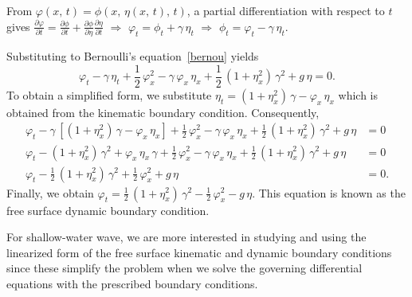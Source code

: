 \documentclass[12pt,a4paper]{report}
\begin{document}
From $\varphi(x,\,t) = \phi(x, \, \eta(x,\,t), \,t)$, a partial differentiation with respect to $t$ gives $\displaystyle \frac{\partial \varphi}{\partial t} =
\frac{\partial\phi}{\partial t} + \frac{\partial\phi}{\partial\eta} \frac{\partial\eta}{\partial t}$ \quad $\Longrightarrow$ \quad $\varphi_{t} = \phi_{t} +
\gamma \,\eta_{t}$ \quad $\Longrightarrow$ \quad $\phi_{t} = \varphi_{t} - \gamma\,\eta_{t}$.

Substituting to Bernoulli's equation~\eqref{bernou} yields
\begin{equation}
\varphi_{t} - \gamma\,\eta_{t} + \frac{1}{2}\,\varphi_{x}^2 - \gamma \,\varphi_{x} \, \eta_{x} + \frac{1}{2}\,\left(1 + \eta_{x}^2 \right) \,\gamma^2 + g\,\eta = 0.
\end{equation}
To obtain a simplified form, we substitute $\eta_{t} = \left(1 + \eta_{x}^2 \right) \,\gamma - \varphi_{x}\,\eta_{x}$ which is obtained from the kinematic boundary condition. Consequently,
\begin{align}
\varphi_{t} - \gamma\, \left[\left(1 + \eta_{x}^2 \right) \,\gamma - \varphi_{x}\,\eta_{x} \right] + \frac{1}{2}\,\varphi_{x}^2 - \gamma\,\varphi_{x}\,\eta_{x} + \frac{1}{2}\,\left(1 + \eta_{x}^2 \right) \,\gamma^2 + g\,\eta &= 0 \\
\varphi_{t} - \left(1 + \eta_{x}^2 \right) \,\gamma^2 + \varphi_{x}\,\eta_{x}\,\gamma + \frac{1}{2}\,\varphi_{x}^2 - \gamma\,\varphi_{x}\,\eta_{x} + \frac{1}{2} \,\left(1 + \eta_{x}^2 \right) \,\gamma^2 + g\,\eta &= 0 \\
\varphi_{t} - \frac{1}{2} \,\left(1 + \eta_{x}^2 \right) \,\gamma^2 + \frac{1}{2} \,\varphi_{x}^2 + g\,\eta &= 0.
\end{align}
Finally, we obtain $\displaystyle \varphi_{t} = \frac{1}{2} \,\left(1 + \eta_{x}^2 \right) \,\gamma^2 -\frac{1}{2} \,\varphi_{x}^2 - g\,\eta$. This equation is known as the free surface dynamic boundary condition.

For shallow-water wave, we are more interested in studying and using the linearized form of the free surface kinematic and dynamic boundary conditions since these simplify the problem when we solve the governing differential equations with the prescribed boundary conditions.
\end{document}
